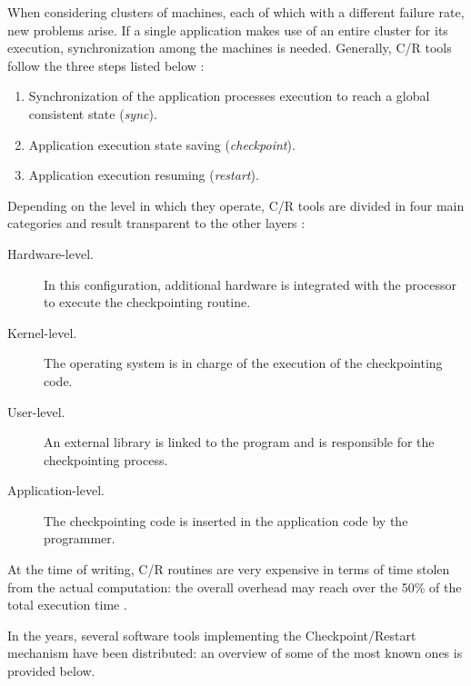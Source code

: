 When considering clusters of machines, each of which with a different failure rate, new problems arise. If a single application makes use of an entire cluster for its execution, synchronization among the machines is needed. Generally, C/R tools follow the three steps listed below \cite{reghenzani_2016}:
\begin{enumerate}
    \item Synchronization of the application processes execution to reach a global consistent state (\emph{sync}).
    \item Application execution state saving (\emph{checkpoint}).
    \item Application execution resuming (\emph{restart}).
\end{enumerate}
Depending on the level in which they operate, C/R tools are divided in four main categories and result transparent to the other layers \cite{app-checkpoint}:
\begin{description}
    \item[Hardware-level.] In this configuration, additional hardware is integrated with the processor to execute the checkpointing routine.
    \item[Kernel-level.] The operating system is in charge of the execution of the checkpointing code.
    \item[User-level.] An external library is linked to the program and is responsible for the checkpointing process.
    \item[Application-level.] The checkpointing code is inserted in the application code by the programmer.
\end{description}
At the time of writing, C/R routines are very expensive in terms of time stolen from the actual computation: the overall overhead  may reach over the 50\% of the total execution time \cite{6468485}.

In the years, several software tools implementing the Checkpoint/Restart mechanism have been distributed: an overview of some of the most known ones is provided below.

